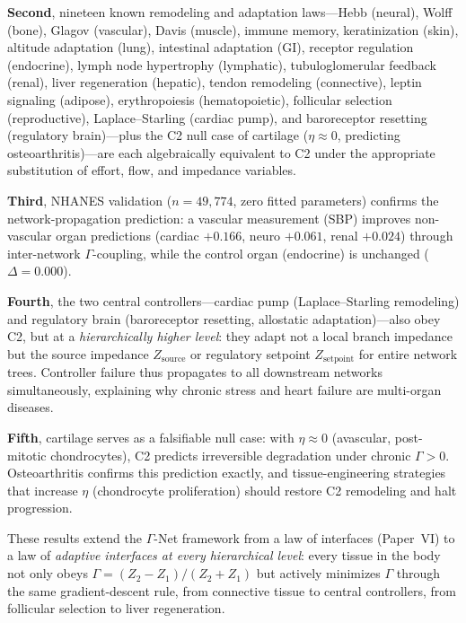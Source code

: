 \documentclass[aps,pre,twocolumn,superscriptaddress,floatfix]{revtex4-2}
\begin{document}
\textbf{Second}, nineteen known remodeling and adaptation
laws---Hebb (neural), Wolff (bone), Glagov (vascular),
Davis (muscle), immune memory, keratinization (skin),
altitude adaptation (lung), intestinal adaptation (GI),
receptor regulation (endocrine), lymph node hypertrophy
(lymphatic), tubuloglomerular feedback (renal), liver
regeneration (hepatic), tendon remodeling (connective),
leptin signaling (adipose), erythropoiesis (hematopoietic),
follicular selection (reproductive), Laplace--Starling
(cardiac pump), and baroreceptor resetting (regulatory
brain)---plus the C2 null case of cartilage
($\eta \approx 0$, predicting osteoarthritis)---are
each algebraically equivalent to C2 under the appropriate
substitution of effort, flow, and impedance variables.

\textbf{Third}, NHANES validation ($n = 49{,}774$,
zero fitted parameters) confirms the network-propagation
prediction: a vascular measurement (SBP) improves
non-vascular organ predictions (cardiac $+0.166$,
neuro $+0.061$, renal $+0.024$) through inter-network
$\Gamma$-coupling, while the control organ (endocrine)
is unchanged ($\Delta = 0.000$).

\textbf{Fourth}, the two central controllers---cardiac
pump (Laplace--Starling remodeling) and regulatory brain
(baroreceptor resetting, allostatic adaptation)---also
obey C2, but at a \emph{hierarchically higher level}:
they adapt not a local branch impedance but the source
impedance $Z_{\text{source}}$ or regulatory setpoint
$Z_{\text{setpoint}}$ for entire network trees.
Controller failure thus propagates to all downstream
networks simultaneously, explaining why chronic stress
and heart failure are multi-organ diseases.

\textbf{Fifth}, cartilage serves as a falsifiable null
case: with $\eta \approx 0$ (avascular, post-mitotic
chondrocytes), C2 predicts irreversible degradation
under chronic $\Gamma > 0$.  Osteoarthritis confirms
this prediction exactly, and tissue-engineering strategies
that increase $\eta$ (chondrocyte proliferation) should
restore C2 remodeling and halt progression.

These results extend the $\Gamma$-Net framework from
a law of interfaces (Paper~VI) to a law of
\emph{adaptive interfaces at every hierarchical level}:
every tissue in the body not only obeys
$\Gamma = (Z_2 - Z_1)/(Z_2 + Z_1)$
but actively minimizes $\Gamma$ through the same
gradient-descent rule, from connective tissue to
central controllers, from follicular selection to
liver regeneration.
\end{document}
